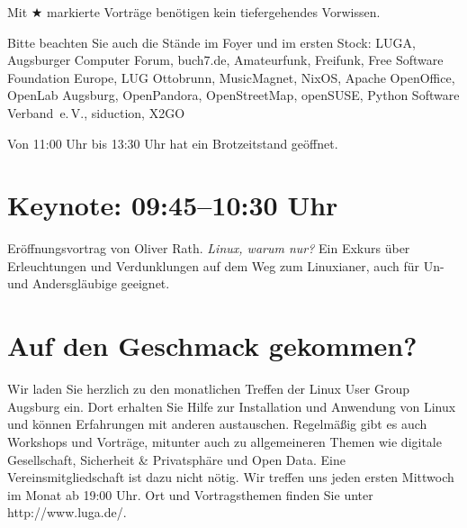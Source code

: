 \documentclass[10pt,a4paper,ngerman]{scrartcl}
\begin{document}
\begin{landscape}
\medskip
Mit $\bigstar$ markierte Vorträge benötigen kein tiefergehendes Vorwissen.
\medskip

Bitte beachten Sie auch die Stände im Foyer und im ersten Stock: LUGA, Augsburger Computer Forum, buch7.de, Amateurfunk, Freifunk, Free Software Foundation Europe, LUG Ottobrunn, MusicMagnet, NixOS, Apache OpenOffice, OpenLab Augsburg, OpenPandora, OpenStreetMap, openSUSE, Python Software Verband~e.\,V., siduction, X2GO
\medskip

Von 11:00 Uhr bis 13:30 Uhr hat ein Brotzeitstand geöffnet.

\vfill

\begin{multicols}{2}

\section{Keynote: 09:45--10:30 Uhr}
Eröffnungsvortrag von Oliver Rath. \emph{Linux, warum nur?} Ein Exkurs über Erleuchtungen und Verdunklungen auf dem Weg zum Linuxianer, auch für Un- und Andersgläubige geeignet.

\vfill
\columnbreak

\section{Auf den Geschmack gekommen?}

Wir laden Sie herzlich zu den monatlichen Treffen der Linux User Group Augsburg
ein. Dort erhalten Sie Hilfe zur Installation und Anwendung von Linux und
können Erfahrungen mit anderen austauschen. Regelmäßig gibt es auch Workshops
und Vorträge, mitunter auch zu allgemeineren Themen wie digitale Gesellschaft,
Sicherheit \& Privatsphäre und Open Data.
Eine Vereinsmitgliedschaft ist dazu
nicht nötig. Wir treffen uns jeden ersten Mittwoch im Monat ab 19:00 Uhr.
Ort und Vortragsthemen finden Sie unter http://www.luga.de/.

\end{multicols}

\end{landscape}

\newpage
\end{document}
